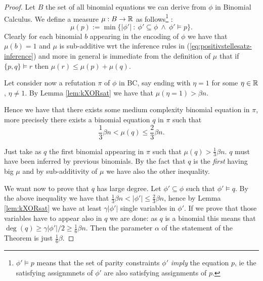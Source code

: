 \documentclass[a4paper,twoside,justified]{tufte-handout}
\begin{document}
\begin{proof}
Let $B$ the set of all binomial equations we can derive from $\phi$ in Binomial Calculus. 
We define a measure $\mu:B\rightarrow \mathbb{R}$ as follows\footnote{
$\phi'\models p$ means that the set of parity constraints $\phi'$ \emph{imply} the equation $p$, ie the satisfying assignmnets of $\phi'$ are also satisfying assignments of $p$.
}
:
\begin{equation}\label{eq:mu-kXOR}
\mu(p):=\min\{|\phi'|\ :\ \phi'\subseteq \phi\ \wedge\ \phi'\models p\}.
\end{equation}
Clearly for each binomial $b$ appearing in the encoding of $\phi$ we have that $\mu(b)= 1$ and $\mu$ is sub-additive wrt the inference rules in (\ref{eq:positivstellesatz-inference}) and more in general is immediate from the definition of $\mu$ that if $\{p,q\}\models r$ then $\mu(r)\leq \mu(p)+\mu(q)$. 

Let consider now a refutation $\pi$ of $\phi$ in BC, say ending with $\eta=1$ for some $\eta\in \mathbb{R}$, $\eta\neq 1$. By Lemma \ref{lem:kXORsat} we have that $\mu(\eta=1)>\beta n$.

Hence we have that there exists some medium complexity binomial equation in $\pi$, more precisely there exists a binomial equation $q$ in $\pi$ such that
\begin{equation*}
\frac{1}{3}\beta n< \mu(q)\leq \frac{2}{3}\beta n.
\end{equation*}

Just take as $q$ the first binomial appearing in $\pi$ such that $\mu(q)>\frac{1}{3}\beta n$. $q$ must have been inferred by previous binomials. 
By the fact that $q$ is the \emph{first} having big $\mu$ and by sub-additivity of $\mu$ we have also the other inequality.

We want now to prove that $q$ has large degree. Let $\phi'\subseteq \phi$ such that $\phi'\models q$. 
By the above inequality we have that $\frac{1}{3}\beta n < |\phi'|\leq \frac{2}{3}\beta n$, hence by Lemma \ref{lem:kXORsat} we have at least $\gamma |\phi'|$ single variables in $\phi'$. 
If we prove that those variables have to appear also in $q$ we are done: as $q$ is a binomial this means that $\deg(q)\geq \gamma |\phi'|/2\geq \frac{1}{6}\beta n$. 
Then the parameter $\alpha$ of the statement of the Theorem is just $\frac{1}{6}\beta$.


\end{proof}
\end{document}

